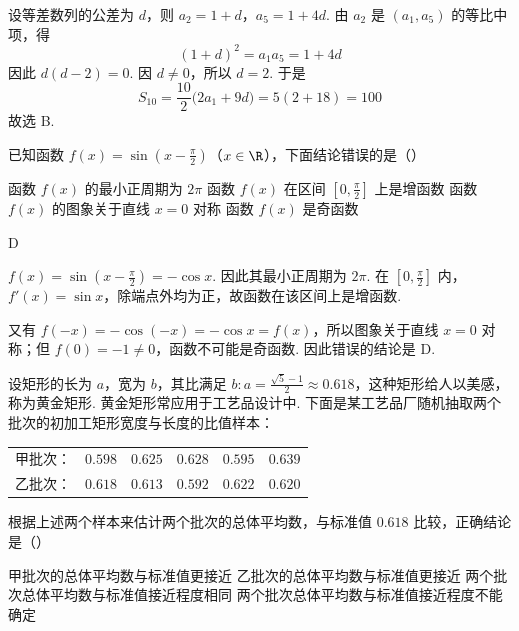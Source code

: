 \begin{solution}
设等差数列的公差为 \(d\)，则
\(a_2=1+d\)，\(a_5=1+4d\). 由 \(a_2\) 是 \((a_1,a_5)\) 的等比中项，得
\[
(1+d)^2=a_1a_5=1+4d
\]
因此 \(d(d-2)=0\). 因 \(d\ne0\)，所以 \(d=2\). 于是
\[
S_{10}=\frac{10}{2}\bigl(2a_1+9d\bigr)=5(2+18)=100
\]
故选 B.
\end{solution}

\begin{problem}
已知函数 \(f(x) = \sin\left(x - \frac{\pi}{2}\right)\)（\(x \in \R\)），下面结论错误的是（\quad）

\choices
    {函数 \(f(x)\) 的最小正周期为 \(2\pi\)}
    {函数 \(f(x)\) 在区间 \(\left[0, \frac{\pi}{2}\right]\) 上是增函数}
    {函数 \(f(x)\) 的图象关于直线 \(x = 0\) 对称}
    {函数 \(f(x)\) 是奇函数}
\end{problem}

\begin{answer}
D
\end{answer}

\begin{solution}
\(f(x)=\sin\left(x-\frac{\pi}{2}\right)=-\cos x\). 因此其最小正周期为
\(2\pi\). 在 \(\left[0,\frac{\pi}{2}\right]\) 内，\(f'(x)=\sin x\)，除端点外均为正，故函数在该区间上是增函数.

又有 \(f(-x)=-\cos(-x)=-\cos x=f(x)\)，所以图象关于直线 \(x=0\) 对称；但
\(f(0)=-1\ne0\)，函数不可能是奇函数. 因此错误的结论是 D.
\end{solution}

\begin{problem}
设矩形的长为 \(a\)，宽为 \(b\)，其比满足 \(b : a = \frac{\sqrt{5} - 1}{2} \approx 0.618\)，这种矩形给人以美感，称为黄金矩形. 黄金矩形常应用于工艺品设计中. 下面是某工艺品厂随机抽取两个批次的初加工矩形宽度与长度的比值样本：

\begin{center}
\begin{tabular}{c|ccccc}
甲批次： & \(0.598\) & \(0.625\) & \(0.628\) & \(0.595\) & \(0.639\) \\
乙批次： & \(0.618\) & \(0.613\) & \(0.592\) & \(0.622\) & \(0.620\)
\end{tabular}
\end{center}

根据上述两个样本来估计两个批次的总体平均数，与标准值 \(0.618\) 比较，正确结论是（\quad）

\choices
    {甲批次的总体平均数与标准值更接近}
    {乙批次的总体平均数与标准值更接近}
    {两个批次总体平均数与标准值接近程度相同}
    {两个批次总体平均数与标准值接近程度不能确定}
\end{problem}

